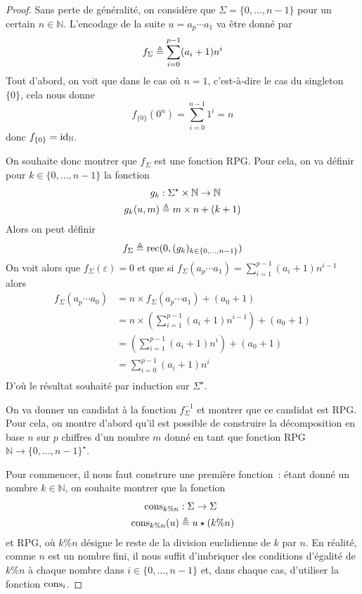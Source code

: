 \begin{proof}
  Sans perte de généralité, on considère que $\Sigma = \{0,\ldots,n-1\}$ pour un
  certain $n \in \mathbb N$. L'encodage de la suite $u = a_p\cdots a_1$ va être
  donné par
  \[f_\Sigma \triangleq \sum_{i = 0}^{p-1} (a_i + 1) n^i\]
  Tout d'abord, on voit que dans le cas où $n = 1$, c'est-à-dire le cas du
  singleton $\{0\}$, cela nous donne
  \[f_{\{0\}}(0^n) = \sum_{i = 0}^{n-1} 1^i = n\]
  donc $f_{\{0\}} = \operatorname{id}_\mathbb N$.

  On souhaite donc montrer que $f_\Sigma$ est une fonction RPG. Pour cela, on
  va définir pour $k \in \{0,\ldots,n-1\}$ la fonction
  \begin{align*}
  g_k &: \Sigma^\star \times \mathbb N \to \mathbb N\\
  g_k(u,m) &\triangleq m \times n + (k + 1)
  \end{align*}
  Alors on peut définir
  \[f_\Sigma \triangleq \operatorname{rec}(0,(g_k)_{k\in\{0,\ldots,n-1\}})\]
  On voit alors que $f_\Sigma(\varepsilon) = 0$ et que si
  $f_\Sigma(a_p\cdots a_1) = \sum_{i = 1}^{p-1} (a_i + 1)n^{i-1}$ alors
  \begin{align*}
    f_\Sigma(a_p\cdots a_0) &= n \times f_\Sigma(a_p\cdots a_1) + (a_0 + 1)\\
    &= n \times \left(\sum_{i = 1}^{p-1} (a_i + 1) n^{i-1}\right) + (a_0+1)\\
    &= \left(\sum_{i = 1}^{p-1} (a_i+1) n^i\right) + (a_0+1)\\
    &= \sum_{i = 0}^{p-1} (a_i + 1) n^i\\
  \end{align*}
  D'où le résultat souhaité par induction sur $\Sigma^\star$.

  On va donner un candidat à la fonction $f_\Sigma^{-1}$ et montrer que ce
  candidat est RPG. Pour cela, on montre d'abord qu'il est possible
  de construire la décomposition en base $n$ sur $p$ chiffres d'un nombre $m$
  donné en tant que fonction RPG $\mathbb N \to \{0,\ldots,n-1\}^\star$.

  Pour commencer, il nous faut construre une première fonction~: étant donné un
  nombre $k \in \mathbb N$, on souhaite montrer que la fonction
  \begin{align*}
    \operatorname{cons}_{k\% n} &: \Sigma\to\Sigma\\
    \operatorname{cons}_{k\% n}(u) &\triangleq u\star (k \% n)
  \end{align*}
  et RPG, où $k \% n$ désigne le reste de la division euclidienne de $k$ par
  $n$. En réalité, comme $n$ est un nombre fini, il nous suffit d'imbriquer des
  conditions d'égalité de $k \% n$ à chaque nombre dans $i\in\{0,\ldots,n-1\}$
  et, dans chaque cas, d'utiliser la fonction $\operatorname{cons}_i$.


\end{proof}
